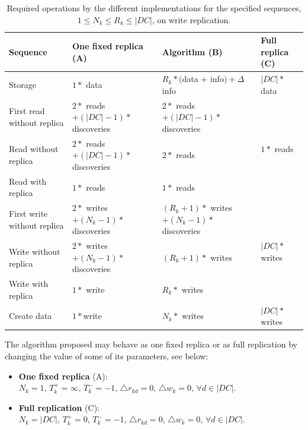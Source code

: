 \documentclass[english]{article}
\begin{document}
\begin{table}
	\centering
	\begin{tabular}{|l||l|l|l|}
		\hline
		{\bf Sequence} & {\bf One fixed replica {\small (A)}} &  {\bf Algorithm {\small (B)}} & {\bf Full replica {\small (C)}} \\
		\hline
		\hline
		Storage                              & $1 * $ data
												  & $R_{k} * ($data $ + $ info$) + \Delta$info
												  & $|DC| * $ data \\
		\hline

		\hline
		First read without replica   & $2 * $ reads $ + (|DC| - 1) * $ discoveries 
								                  & $2 * $ reads $ + (|DC| - 1) * $ discoveries 
								                  & \multirow{3}{*}{$1 * $ reads} \\
	    \cline{1-3}
		Read without replica          & $2 * $ reads $ + (|DC| - 1) * $ discoveries
									              & $2 * $ reads 
				                                  & \\
		\cline{1-3}
		Read with replica               & $1 * $ reads
												  & $1 * $ reads
												  & \\
		\hline

		\hline
		First write without replica   & $2 * $ writes $ + (N_{k} - 1) * $ discoveries
												   & $(R_{k} + 1) * $ writes $ + (N_{k} - 1) * $ discoveries
												   & \multirow{3}{*}{$|DC| * $ writes} \\
		\cline{1-3}
		Write without replica           & $2 * $ writes $ + (N_{k} - 1) * $ discoveries
												   &  $(R_{k} + 1) * $ writes
												   & \\
		\cline{1-3}
		Write with replica                & $1 * $ write
												   & $R_{k} * $ writes
												   & \\
		\hline
		
		\hline
		Create data                         & $1 * $write
												   & $N_{k} * $ writes
												   & $|DC| * $ writes \\
		\hline
	\end{tabular}

	\caption{Required operations by the different implementations for the specified sequences, $1 \le N_{k} \le R_{k} \le |DC|$, on write replication.}
	\label{tb:implementations_sds}
\end{table}

The algorithm proposed may behave as one fixed replica or as full replication by changing the value of some of its parameters, see below:
\begin{itemize}
	\item {\bf One fixed replica} (A):\\
	$N_{k} = 1$, $T^{+}_{k} = \infty$, $T^{-}_{k} = -1$, $\bigtriangleup r_{kd} = 0$, $\bigtriangleup w_{k} = 0$, $\forall d \in |DC|$.

	\item {\bf Full replication} (C):\\
	$N_{k} = |DC|$, $T^{+}_{k} = 0$, $T^{-}_{k} = -1$, $\bigtriangleup r_{kd} = 0$, $\bigtriangleup w_{k} = 0$, $\forall d \in |DC|$.
\end{itemize}
\end{document}
